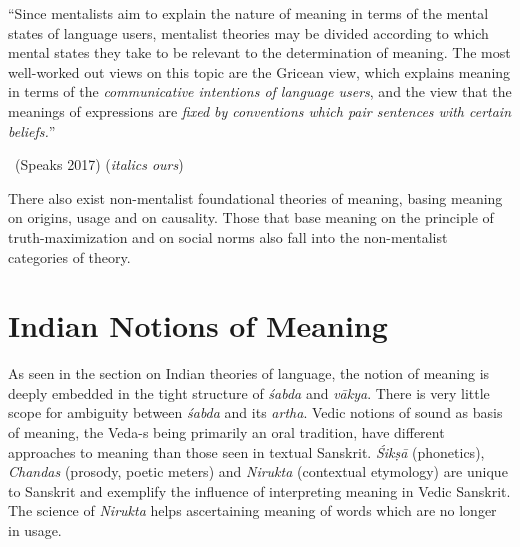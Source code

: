 \begin{myquote}
“Since mentalists aim to explain the nature of meaning in terms of the mental states of language users, mentalist theories may be divided according to which mental states they take to be relevant to the determination of meaning. The most well-worked out views on this topic are the Gricean view, which explains meaning in terms of the \textit{communicative intentions of language users}, and the view that the meanings of expressions are \textit{fixed by conventions which pair sentences with certain beliefs.}”

~\hfill (Speaks 2017) (\textit{italics ours})
\end{myquote}

There also exist non-mentalist foundational theories of meaning, basing meaning on origins, usage and on causality. Those that base meaning on the principle of truth-maximization and on social norms also fall into the non-mentalist categories of theory.


\section*{Indian Notions of Meaning}

\vskip -5pt

As seen in the section on Indian theories of language, the notion of meaning is deeply embedded in the tight structure of \textit{śabda} and \textit{vākya}. There is very little scope for ambiguity between \textit{śabda} and its \textit{artha}. Vedic notions of sound as basis of meaning, the Veda-s being primarily an oral tradition, have different approaches to meaning than those seen in textual Sanskrit. \textit{Śikṣā} (phonetics), \textit{Chandas} (prosody, poetic meters) and \textit{Nirukta} (contextual etymology) are unique to Sanskrit and exemplify the influence of interpreting meaning in Vedic Sanskrit. The science of \textit{Nirukta} helps ascertaining meaning of words which are no longer in usage.


